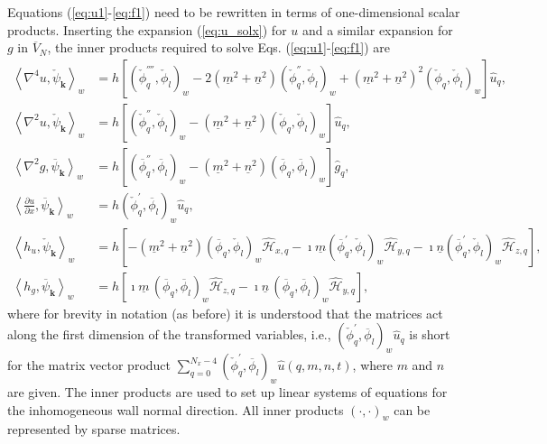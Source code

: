 \documentclass[preprint]{elsarticle}
\newcommand{\N}[1]{\check{#1}}
\newcommand{\D}[1]{\overline{#1}}
\begin{document}
Equations (\ref{eq:u1}-\ref{eq:f1}) need to be rewritten in terms of one-dimensional scalar products. 
Inserting the expansion (\ref{eq:u_solx}) for $u$ and a similar expansion for $g$ in $\D{V}_N$, the inner products required to solve Eqs. (\ref{eq:u1}-\ref{eq:f1}) are
\begin{align}
\left<\nabla^4u, \N{\psi}_{\bm{k}}\right>_w &= h\left[ \left( 
\N{\phi}_q^{''''}, 
\N{\phi}_l\right)_w -2(\underline{m}^2+\underline{n}^2) \left( \N{\phi}_q^{''}, 
\N{\phi}_l\right)_w + (\underline{m}^2+\underline{n}^2)^2\left( \N{\phi}_q, 
\N{\phi}_l\right)_w  \right] \hat{u}_q, \\
\left< \nabla^2 u, \N{\psi}_{\bm{k}}\right>_w &= h\left[\left( \N{\phi}_q^{''}, 
\N{\phi}_l\right)_w - (\underline{m}^2+\underline{n}^2)\left( \N{\phi}_q, 
\N{\phi}_l \right)_w \right] \hat{u}_q, \\
\left< \nabla^2 g, \D{\psi}_{\bm{k}}\right>_w &= h\left[\left( \D{\phi}_q^{''}, 
\D{\phi}_l\right)_w - (\underline{m}^2+\underline{n}^2)\left( \D{\phi}_q, 
\D{\phi}_l \right)_w \right] \hat{g}_q, \\
\left<\frac{\partial u}{\partial x}, \D{\psi}_{\bm{k}}\right>_w &=
h\left(\N{\phi}_q^{'}, \D{\phi}_l\right)_w \hat{u}_q, \\
\left<h_u, \N{\psi}_{\bm{k}} \right>_w &= 
h\left[-(\underline{m}^2+\underline{n}^2) 
\left(\D{\phi}_q, 
\N{\phi}_l \right)_w \hat{\mathcal{H}}_{x, q} - \imath \underline{m}\left(\D{\phi}_q^{'}, 
\N{\phi}_l \right)_w \hat{\mathcal{H}}_{y, q} - \imath 
\underline{n}\left(\D{\phi}_q^{'}, \N{\phi}_l \right)_w 
\hat{\mathcal{H}}_{z, q}\right], \label{eq:S_hv}
\\
\left< h_g, \D{\psi}_{\bm{k}} \right>_w &= h\left[ \imath \underline{m}\, \left(\D{\phi}_q, \D{\phi}_l \right)_w 
\hat{\mathcal{H}}_{z, q} - \imath \underline{n}\, \left(\D{\phi}_q, \D{\phi}_l \right)_w \hat{\mathcal{H}}_{y, q} 
\right],\label{eq:S_hg}
\end{align}
where for brevity in notation (as before) it is understood that the matrices 
act along the first dimension of the transformed variables, i.e.,  $ 
\left(\N{\phi}_q^{'}, \D{\phi}_l\right)_w \hat{u}_q$ is short for the matrix 
vector product $ \sum_{q=0}^{N_x-4}\left( \N{\phi}_q^{'}, \D{\phi}_l\right)_w 
\hat{u}(q, {m}, {n}, t)$, where $m$ and $n$ are given. The inner products are used to set up linear systems 
of equations for the inhomogeneous wall normal direction. All inner products 
$\left(\cdot, \cdot\right)_w$ can be represented by sparse matrices.
\end{document}
